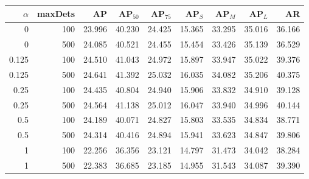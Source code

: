 \begin{tabular}{rrrrrrrrr}
\toprule
$\alpha$ & maxDets & AP & AP$_{50}$ & AP$_{75}$ & AP$_S$ & AP$_M$ & AP$_L$ & AR\\
\midrule
0 & 100 & 23.996 & 40.230 & 24.425 & 15.365 & 33.295 & 35.016 & 36.166\\
0 & 500 & 24.085 & 40.521 & 24.455 & 15.454 & 33.426 & 35.139 & 36.529\\
0.125 & 100 & 24.510 & 41.043 & 24.972 & 15.897 & 33.947 & 35.022 & 39.376\\
0.125 & 500 & 24.641 & 41.392 & 25.032 & 16.035 & 34.082 & 35.206 & 40.375\\
0.25 & 100 & 24.435 & 40.804 & 24.940 & 15.906 & 33.832 & 34.910 & 39.128\\
0.25 & 500 & 24.564 & 41.138 & 25.012 & 16.047 & 33.940 & 34.996 & 40.144\\
0.5 & 100 & 24.189 & 40.071 & 24.827 & 15.803 & 33.535 & 34.834 & 38.771\\
0.5 & 500 & 24.314 & 40.416 & 24.894 & 15.941 & 33.623 & 34.847 & 39.806\\
1 & 100 & 22.256 & 36.356 & 23.121 & 14.797 & 31.473 & 34.042 & 38.284\\
1 & 500 & 22.383 & 36.685 & 23.185 & 14.955 & 31.543 & 34.087 & 39.390\\
\bottomrule
\end{tabular}
